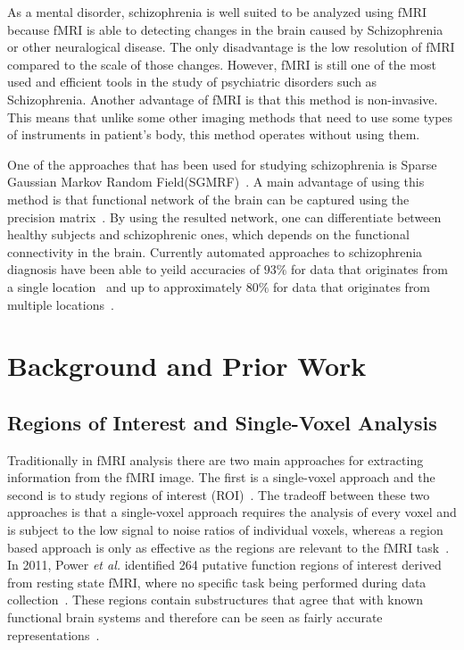 \documentclass{article} %
\begin{document}
As a mental disorder, schizophrenia is well suited to be analyzed using fMRI 
because fMRI is able to detecting changes in the brain caused by Schizophrenia
or other neuralogical disease\cite{}. The only disadvantage 
is the low resolution of fMRI compared to the scale of those changes. 
However, fMRI is still one of the most used and efficient tools in the study of 
psychiatric disorders such as Schizophrenia\cite{}. Another advantage of fMRI 
is that this method is non-invasive. This means that unlike some other imaging 
methods that need to use some types of instruments in patient's body, this 
method operates without using them\cite{}. 

One of the approaches that has been used for studying schizophrenia is 
Sparse Gaussian Markov Random Field(SGMRF)~\cite{Rish_2013}\cite{Rosa_2013}. 
A main advantage of using this method is that functional network of the brain 
can be captured using the precision matrix~\cite{Rish_2013}.
By using the resulted network, one can differentiate between healthy subjects 
and schizophrenic ones, which depends on the functional connectivity in the brain.      
Currently automated approaches to schizophrenia
diagnosis have been able to yeild accuracies of $93\%$ for data that 
originates from a single location~\cite{Rish_2013} and up to approximately 
$80\%$ for data that originates from multiple locations~\cite{Cheng2015}.


\section{Background and Prior Work}

\subsection{Regions of Interest and Single-Voxel Analysis}
Traditionally in fMRI analysis there are two main approaches for extracting
information from the fMRI image. The first is a single-voxel approach and 
the second is to study regions of interest (ROI)~\cite{heller2006cluster}. 
The tradeoff between these two approaches is that a single-voxel approach
requires the analysis of every voxel and is subject to the low signal to 
noise ratios of individual voxels, whereas a region based approach is only
as effective as the regions are relevant to the fMRI 
task~\cite{heller2006cluster}. In 2011, Power \emph{et al.} identified 264 
putative function regions of interest derived from resting state fMRI, where 
no specific task being performed during data collection~\cite{Power_2011}. 
These regions contain substructures that agree that with known functional 
brain systems and therefore can be seen as fairly accurate 
representations~\cite{Power_2011}.
\end{document}
